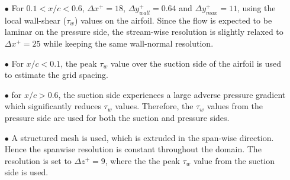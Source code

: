 \begin{itemize}
	\item[$\bullet$] For $0.1<x/c<0.6$, $\Delta x^{+}=18$, $\Delta y_{wall}^{+}=0.64$ and $\Delta y_{max}^{+}=11$, using the local wall-shear ($\tau_{w}$) values on the airfoil. Since the flow is expected to be laminar on the pressure side, the stream-wise resolution is slightly relaxed to $\Delta x^{+}=25$ while keeping the same wall-normal resolution.
	\item[$\bullet$] For $x/c<0.1$, the peak $\tau_{w}$ value over the suction side of the airfoil is used to estimate the grid spacing.
	\item [$\bullet$] for $x/c>0.6$, the suction side experiences a large adverse pressure gradient which significantly reduces $\tau_{w}$ values. Therefore, the $\tau_{w}$ values from the pressure side are used for both the suction and pressure sides.
	\item [$\bullet$] A structured mesh is used, which is extruded in the span-wise direction. Hence the spanwise resolution is constant throughout the domain. The resolution is set to $\Delta z^{+}=9$, where the the peak $\tau_{w}$ value from the suction side is used.
\end{itemize}

